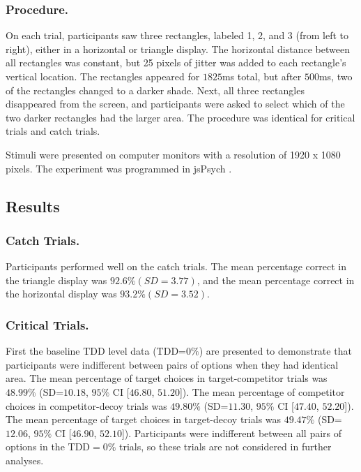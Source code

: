 \subsubsection{Procedure.}

On each trial, participants saw three rectangles, labeled 1, 2, and 3 (from left to right), either in a horizontal or triangle display. The horizontal distance between all rectangles was constant, but 25 pixels of jitter was added to each rectangle's vertical location. The rectangles appeared for $1825$ms total, but after $500$ms, two of the rectangles changed to a darker shade. Next, all three rectangles disappeared from the screen, and participants were asked to select which of the two darker rectangles had the larger area. The procedure was identical for critical trials and catch trials.

Stimuli were presented on computer monitors with a resolution of 1920 x 1080 pixels. The experiment was programmed in jsPsych \parencite{deleeuwJsPsychJavaScriptLibrary2015}. 

\subsection{Results}

\subsubsection{Catch Trials.}
Participants performed well on the catch trials. The mean percentage correct in the triangle display was $92.6\% (SD=3.77)$, and the mean percentage correct in the horizontal display was $93.2\% (SD=3.52)$. 

\subsubsection{Critical Trials.}
First the baseline TDD level data (TDD=$0\%$) are presented to demonstrate that participants were indifferent between pairs of options when they had identical area. The mean percentage of target choices in target-competitor trials was $48.99\%$ (SD=$10.18$, $95\%$ CI [$46.80$, $51.20$]). The mean percentage of competitor choices in competitor-decoy trials was $49.80\%$ (SD=$11.30$, $95\%$ CI [$47.40$, $52.20$]). The mean percentage of target choices in target-decoy trials was $49.47\%$ (SD=$12.06$, $95\%$ CI [$46.90$, $52.10$]). Participants were indifferent between all pairs of options in the $\text{TDD}=0\%$ trials, so these trials are not considered in further analyses.

